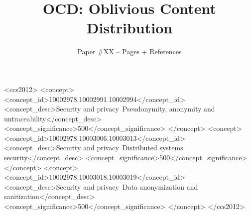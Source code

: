 \documentclass[sigconf]{acmart}
\begin{document}
\date{}
\title{OCD: Oblivious Content Distribution}
\author{
{Paper \#XX -- \pageref{lastpage} Pages + References} \\
}



\begin{abstract}
\end{abstract}

\begin{CCSXML}
<ccs2012>
<concept>
<concept_id>10002978.10002991.10002994</concept_id>
<concept_desc>Security and privacy~Pseudonymity, anonymity and untraceability</concept_desc>
<concept_significance>500</concept_significance>
</concept>
<concept>
<concept_id>10002978.10003006.10003013</concept_id>
<concept_desc>Security and privacy~Distributed systems security</concept_desc>
<concept_significance>500</concept_significance>
</concept>
<concept>
<concept_id>10002978.10003018.10003019</concept_id>
<concept_desc>Security and privacy~Data anonymization and sanitization</concept_desc>
<concept_significance>500</concept_significance>
</concept>
</ccs2012>
\end{CCSXML}




\maketitle






%
%




\label{lastpage} 


 
\end{document}
